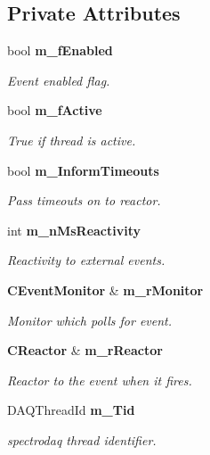 \subsection*{Private Attributes}
\begin{CompactItemize}
\item 
bool {\bf m\_\-f\-Enabled}
\begin{CompactList}\small\item\em Event enabled flag.\item\end{CompactList}\item 
bool {\bf m\_\-f\-Active}
\begin{CompactList}\small\item\em True if thread is active.\item\end{CompactList}\item 
bool {\bf m\_\-Inform\-Timeouts}
\begin{CompactList}\small\item\em Pass timeouts on to reactor.\item\end{CompactList}\item 
int {\bf m\_\-n\-Ms\-Reactivity}
\begin{CompactList}\small\item\em Reactivity to external events.\item\end{CompactList}\item 
{\bf CEvent\-Monitor} \& {\bf m\_\-r\-Monitor}
\begin{CompactList}\small\item\em Monitor which polls for event.\item\end{CompactList}\item 
{\bf CReactor} \& {\bf m\_\-r\-Reactor}
\begin{CompactList}\small\item\em Reactor to the event when it fires.\item\end{CompactList}\item 
DAQThread\-Id {\bf m\_\-Tid}
\begin{CompactList}\small\item\em spectrodaq thread identifier.\item\end{CompactList}\end{CompactItemize}


